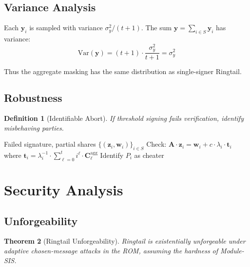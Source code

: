 \documentclass[11pt,a4paper]{article}
\newtheorem{theorem}{Theorem}[section]
\newtheorem{definition}[theorem]{Definition}
\begin{document}
\subsection{Variance Analysis}

Each $\mathbf{y}_i$ is sampled with variance $\sigma_y^2 / (t+1)$. The sum $\mathbf{y} = \sum_{i \in S} \mathbf{y}_i$ has variance:
\[
\text{Var}(\mathbf{y}) = (t+1) \cdot \frac{\sigma_y^2}{t+1} = \sigma_y^2
\]

Thus the aggregate masking has the same distribution as single-signer Ringtail.

\subsection{Robustness}

\begin{definition}[Identifiable Abort]
If threshold signing fails verification, identify misbehaving parties.
\end{definition}

\begin{algorithm}
\caption{Identify Misbehavior}
\begin{algorithmic}[1]
\Require Failed signature, partial shares $\{(\mathbf{z}_i, \mathbf{w}_i)\}_{i \in S}$
    \State Check: $\mathbf{A} \cdot \mathbf{z}_i = \mathbf{w}_i + c \cdot \lambda_i \cdot \mathbf{t}_i$
    \State where $\mathbf{t}_i = \lambda_i^{-1} \cdot \sum_{\ell=0}^{t} i^\ell \cdot \mathbf{C}_\ell^{\text{agg}}$
        \State Identify $P_i$ as cheater
    \EndIf
\EndFor
\end{algorithmic}
\end{algorithm}

\section{Security Analysis}

\subsection{Unforgeability}

\begin{theorem}[Ringtail Unforgeability]
Ringtail is existentially unforgeable under adaptive chosen-message attacks in the ROM, assuming the hardness of Module-SIS.
\end{theorem}
\end{document}
